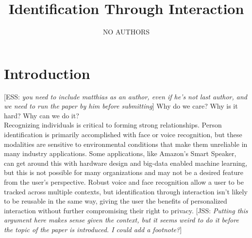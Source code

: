 \documentclass[conference]{IEEEtran}
\title{Identification Through Interaction}
\author{NO AUTHORS} %
\date{\vspace{-1em}}
\newcommand{\elaine}[1]{{\textcolor[rgb]{0.1,0.4,0.6}{[ESS: {\it #1}]}}}
\newcommand{\meta}[1]{{\textcolor[rgb]{0.1,0.7,0.2}{[JSS: {\it #1}]}}}
\begin{document}
\maketitle


\section{Introduction}
\elaine{you need to include matthias as an author, even if he's not last author, and we need to run the paper by him before submitting}
Why do we care? Why is it hard? Why can we do it?\\

Recognizing individuals is critical to forming strong relationships. Person identification is primarily accomplished with face or voice recognition, but these modalities are sensitive to environmental conditions that make them unreliable in many industry applications. Some applications, like Amazon's Smart Speaker, can get around this with hardware design and big-data enabled machine learning, but this is not possible for many organizations and may not be a desired feature from the user's perspective. Robust voice and face recognition allow a user to be tracked across multiple contexts, but identification through interaction isn't likely to be reusable in the same way, giving the user the benefits of personalized interaction without further compromising their right to privacy. \meta{Putting this argument here makes sense given the context, but it seems weird to do it before the topic of the paper is introduced. I could add a footnote?}

\end{document}
